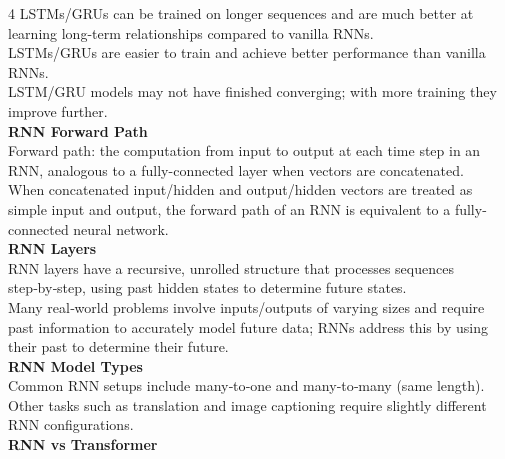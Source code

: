 \documentclass[8pt]{extarticle}
\begin{document}
\begin{multicols}{4}
LSTMs/GRUs can be trained on longer sequences and are much better at learning long-term relationships compared to vanilla RNNs.\\
LSTMs/GRUs are easier to train and achieve better performance than vanilla RNNs.\\
LSTM/GRU models may not have finished converging; with more training they improve further.\\
\vspace{2pt}\textbf{RNN Forward Path}\\
Forward path: the computation from input to output at each time step in an RNN, analogous to a fully-connected layer when vectors are concatenated.\\
When concatenated input/hidden and output/hidden vectors are treated as simple input and output, the forward path of an RNN is equivalent to a fully-connected neural network.\\
\vspace{2pt}\textbf{RNN Layers}\\
RNN layers have a recursive, unrolled structure that processes sequences step‑by‑step, using past hidden states to determine future states.\\
Many real‑world problems involve inputs/outputs of varying sizes and require past information to accurately model future data; RNNs address this by using their past to determine their future.\\
\vspace{2pt}\textbf{RNN Model Types}\\
Common RNN setups include many‑to‑one and many‑to‑many (same length). Other tasks such as translation and image captioning require slightly different RNN configurations.\\
\vspace{2pt}\textbf{RNN vs Transformer}\\


\end{multicols}
\end{document}
